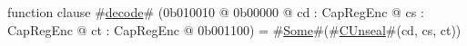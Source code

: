 function clause #\hyperref[zdecode]{decode}# (0b010010 @ 0b00000 @ cd : CapRegEnc @ cs : CapRegEnc @ ct : CapRegEnc @ 0b001100) = #\hyperref[zSome]{Some}#(#\hyperref[zCUnseal]{CUnseal}#(cd, cs, ct))
